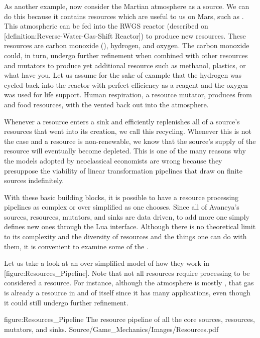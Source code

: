 As another example, now consider the Martian atmosphere as a source. We can do this because it contains resources which are useful to us on Mars, such as . This atmospheric  can be fed into the RWGS reactor (described on [definition:Reverse-Water-Gas-Shift Reactor]) to produce new resources. These resources are carbon monoxide (), hydrogen, and oxygen. The carbon monoxide could, in turn, undergo further refinement when combined with other resources and mutators to produce yet additional resource such as methanol, plastics, or what have you. Let us assume for the sake of example that the hydrogen was cycled back into the reactor with perfect efficiency as a reagent and the oxygen was used for life support. Human respiration, a resource mutator, produces  from  and food resources, with the  vented back out into the atmosphere.

Whenever a resource enters a sink and efficiently replenishes all of a source's resources that went into its creation, we call this recycling. Whenever this is not the case and a resource is non-renewable, we know that the source's supply of the resource will eventually become depleted. This is one of the many reasons why the models adopted by neoclassical economists are wrong because they presuppose the viability of linear transformation pipelines that draw on finite sources indefinitely.

With these basic building blocks, it is possible to have a resource processing pipelines as complex or over simplified as one chooses. Since all of Avaneya's sources, resources, mutators, and sinks are data driven, to add more one simply defines new ones through the Lua interface. Although there is no theoretical limit to its complexity and the diversity of resources and the things one can do with them, it is convenient to examine some of the .

Let us take a look at an over simplified model of how they work in [figure:Resources_Pipeline]. Note that not all resources require processing to be considered a resource. For instance, although the atmosphere is mostly , that gas is already a resource in and of itself since it has many applications, even though it could still undergo further refinement.

\FullPageDiagram
    {figure:Resources_Pipeline}
    {The resource pipeline of all the core sources, resources, mutators, and sinks.}
    {Source/Game_Mechanics/Images/Resources.pdf}

